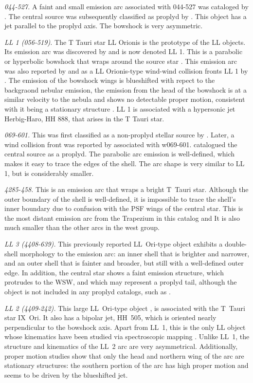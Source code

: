 \documentclass[apj, twocolumn]{aastex63}
\begin{document}
\textit{044-527.} A faint and small emission arc associated with 044-527
was cataloged by \citet{Bally:2000a}. The central source was subsequently
classified as proplyd by \citet{Ricci:2008a}. This object has a jet
parallel to the proplyd axis. The bowshock is very asymmetric.

\textit{LL 1 (056-519).} The T Tauri star LL Orionis is the prototype
of the LL objects. Its emission arc was discovered by
\citet{Gull:1979a} and is now denoted LL 1. This is a parabolic or
hyperbolic bowshock that wraps around the source star
\citep{Bally:2006a}. This emission arc was also reported by
\citet{Bally:2000a} and as a LL Orionis-type wind-wind collision
fronts LL 1 by \citet{Bally:2001a}. The emission of the bowshock wings
is blueshifted with repect to the backgraond nebular emission, the
emission from the head of the bowshock is at a similar velocity to the
nebula and shows no detectable proper motion, consistent with it being
a stationary structure \citep{Henney:2013a}. LL 1 is associated with a
hypersonic jet Herbig-Haro, HH 888, that arises in the T Tauri star.
    

\textit{069-601.} This was first classified as a non-proplyd stellar
source by \citet{ODell:1996a}. Later, a wind collision front was
reported by \citet{Bally:2000a} associated with w069-601.
\citet{Ricci:2008a} catalogued the central source as a proplyd.
The parabolic arc emission is well-defined, which makes it easy to
trace the edges of the shell. The arc shape is very similar to LL 1,
but is considerably smaller. 


\textit{4285-458.} This is an emission arc that wraps a bright T~Tauri
star. Although the outer boundary of the shell is well-defined, it is
impossible to trace the shell's inner boundary due to confusion with
the PSF wings of the central star. This is the most distant emission
arc from the Trapezium in this catalog and It is also much smaller
than the other arcs in the west group.

\textit{LL 3 (4408-639).} This previously reported LL~Ori-type object
\citep{Bally:2001a} exhibits a double-shell morphology to the emission
arc: an inner shell that is brighter and narrower, and an outer shell
that is fainter and broader, but still with a well-defined outer edge.
In addition, the central star shows a faint emission structure, which
protrudes to the WSW, and which may represent a proplyd tail, although
the object is not included in any proplyd catalogs, such as
\citet{Ricci:2008a}.

\textit{LL 2 (4409-242).} This large LL~Ori-type object
\citep{Bally:2001a}, is associated with the T~Tauri star IX~Ori. It
also has a bipolar jet, HH~505, which is oriented nearly perpendicular
to the bowshock axis. Apart from LL~1, this is the only LL object
whose kinematics have been studied via spectroscopic mapping
\citep{Henney:2013a}. Unlike LL~1, the structure and kinematics of the
LL~2 arc are very asymmetrical.  Additionally, proper motion studies
\citep{Henney:2013a} show that only the head and northern wing of the
arc are stationary structures: the southern portion of the arc has
high proper motion and seems to be driven by the blueshifted jet.
\end{document}
